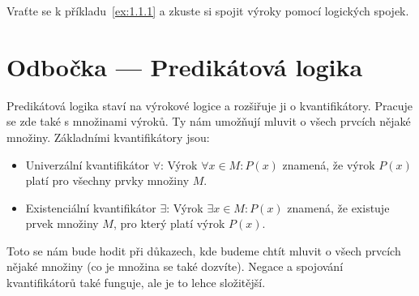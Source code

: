 \begin{problem}
  Vraťte se k příkladu~\ref{ex:1.1.1} a zkuste si spojit výroky pomocí logických spojek.
\end{problem}

\section{Odbočka --- Predikátová logika}
Predikátová logika staví na výrokové logice a rozšiřuje ji o kvantifikátory. Pracuje se zde také s množinami výroků. Ty nám umožňují mluvit o všech prvcích nějaké množiny. Základními kvantifikátory jsou:
\begin{itemize}
  \item Univerzální kvantifikátor $\forall$: Výrok $\forall x \in M: P(x)$ znamená, že výrok $P(x)$ platí pro všechny prvky množiny $M$.
  \item Existenciální kvantifikátor $\exists$: Výrok $\exists x \in M: P(x)$ znamená, že existuje prvek množiny $M$, pro který platí výrok $P(x)$.
\end{itemize}

Toto se nám bude hodit při důkazech, kde budeme chtít mluvit o všech prvcích nějaké množiny (co je množina se také dozvíte). Negace a spojování kvantifikátorů také funguje, ale je to lehce složitější.


